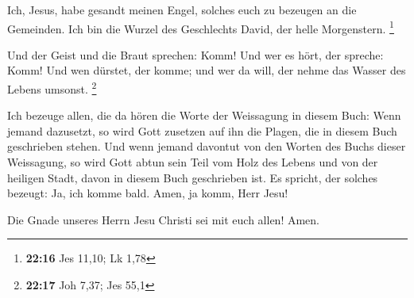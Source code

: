  Ich, Jesus, habe gesandt meinen Engel, solches euch zu
bezeugen an die Gemeinden. Ich bin die Wurzel des Geschlechts David, der
helle Morgenstern. \footnote{\textbf{22:16} Jes 11,10; Lk 1,78}

 Und der Geist und die Braut sprechen: Komm! Und wer es
hört, der spreche: Komm! Und wen dürstet, der komme; und wer da will,
der nehme das Wasser des Lebens umsonst. \footnote{\textbf{22:17} Joh
  7,37; Jes 55,1}

 Ich bezeuge allen, die da hören die Worte der Weissagung
in diesem Buch: Wenn jemand dazusetzt, so wird Gott zusetzen auf ihn die
Plagen, die in diesem Buch geschrieben stehen.  Und wenn
jemand davontut von den Worten des Buchs dieser Weissagung, so wird Gott
abtun sein Teil vom Holz des Lebens und von der heiligen Stadt, davon in
diesem Buch geschrieben ist.  Es spricht, der solches
bezeugt: Ja, ich komme bald. Amen, ja komm, Herr Jesu!

 Die Gnade unseres Herrn Jesu Christi sei mit euch allen!
Amen.
